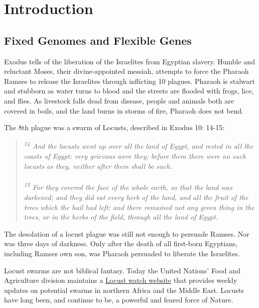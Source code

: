 \chapter{Introduction}  \label{Intro} 

\section{Fixed Genomes and Flexible Genes}
  \label{Intro:sec:Fixed Genomes and Flexible Genes} 

  Exodus tells of the liberation of the Israelites from Egyptian slavery. Humble and reluctant Moses, their divine-appointed messiah, attempts to force the Pharaoh Ramses to release the Israelites through inflicting 10 plagues. Pharaoh is stalwart and stubborn as water turns to blood and the streets are flooded with frogs, lice, and flies. As livestock falls dead from disease, people and animals both are covered in boils, and the land burns in storms of fire, Pharaoh does not bend.

  The 8th plague was a swarm of Locusts, described in Exodus 10: 14-15:

  \begin{quote}
    \itshape
    \singlespacing
    \textsuperscript{14} And the locusts went up over all the land of Egypt, and rested in all the coasts of Egypt: very grievous were they; before them there were no such locusts as they, neither after them shall be such.\\ 
      \\
    \textsuperscript{15} For they covered the face of the whole earth, so that the land was darkened; and they did eat every herb of the land, and all the fruit of the trees which the hail had left: and there remained not any green thing in the trees, or in the herbs of the field, through all the land of Egypt.
    \end{quote}

  The desolation of a locust plague was still not enough to persuade Ramses. Nor was three days of darkness. Only after the death of all first-born Egyptians, including Ramses own son, was Pharaoh persuaded to liberate the Israelites.

  Locust swarms are not biblical fantasy. Today the United Nations' Food and Agriculture division maintains a \href{http://www.fao.org/ag/locusts/en/info/info/news/index.html}{Locust watch website} that provides weekly updates on potential swarms in northern Africa and the Middle East. Locusts have long been, and continue to be, a powerful and feared force of Nature.

